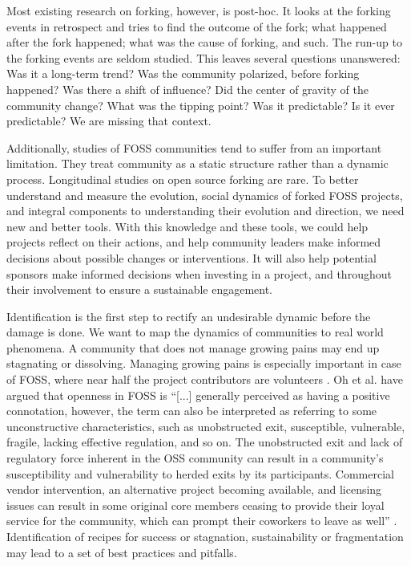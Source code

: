 \documentclass{acm_proc_article-sp}
\begin{document}
Most existing research on forking, however, is post-hoc. It looks at the forking events in retrospect and tries to find the outcome of the fork; what happened after the fork happened; what was the cause of forking, and such. The run-up to the forking events are seldom studied. This leaves several questions unanswered: Was it a long-term trend? Was the community polarized, before forking happened? Was there a shift of influence? Did the center of gravity of the community change? What was the tipping point? Was it predictable? Is it ever predictable? We are missing that context. 

Additionally, studies of FOSS communities tend to suffer from an important limitation. They treat community as a static structure rather than a dynamic process. Longitudinal studies on open source forking are rare. To better understand and measure the evolution, social dynamics of forked FOSS projects, and integral components to understanding their evolution and direction, we need new and better tools. With this knowledge and these tools, we could help projects reflect on their actions, and help community leaders make informed decisions about possible changes or interventions. It will also help potential sponsors make informed decisions when investing in a project, and throughout their involvement to ensure a sustainable engagement. 

Identification is the first step to rectify an undesirable dynamic before the damage is done. We want to map the dynamics of communities to real world phenomena. A community that does not manage growing pains may end up stagnating or dissolving. Managing growing pains is especially important in case of FOSS, where near half the project contributors are volunteers \cite{Forrest}. Oh et al. \cite{Oh} have argued that openness in FOSS is ``[...] generally perceived as having a positive connotation, however, the term can also be interpreted as referring to some unconstructive characteristics, such as unobstructed exit, susceptible, vulnerable, fragile, lacking effective regulation, and so on. The unobstructed exit and lack of regulatory force inherent in the OSS community can result in a community's susceptibility and vulnerability to herded exits by its participants. Commercial vendor intervention, an alternative project becoming available, and licensing issues can result in some original core members ceasing to provide their loyal service for the community, which can prompt their coworkers to leave as well'' \cite{Oh}. Identification of recipes for success or stagnation, sustainability or fragmentation may lead to a set of best practices and pitfalls.
\end{document}
